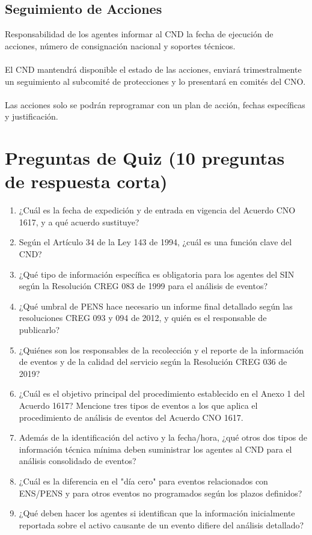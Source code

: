 \documentclass[a5paper]{book}%
\begin{document}
\subsection{Seguimiento de Acciones}

    Responsabilidad de los agentes informar al CND la fecha de ejecución de acciones, número de consignación nacional y soportes técnicos.\\\\
    El CND mantendrá disponible el estado de las acciones, enviará trimestralmente un seguimiento al subcomité de protecciones y lo presentará en comités del CNO.\\\\
    Las acciones solo se podrán reprogramar con un plan de acción, fechas específicas y justificación.

\section{Preguntas de Quiz (10 preguntas de respuesta corta)}

\begin{enumerate}
\item ¿Cuál es la fecha de expedición y de entrada en vigencia del Acuerdo CNO 1617, y a qué acuerdo sustituye?
\item Según el Artículo 34 de la Ley 143 de 1994, ¿cuál es una función clave del CND?
\item ¿Qué tipo de información específica es obligatoria para los agentes del SIN según la Resolución CREG 083 de 1999 para el análisis de eventos?
\item ¿Qué umbral de PENS hace necesario un informe final detallado según las resoluciones CREG 093 y 094 de 2012, y quién es el responsable de publicarlo?
\item ¿Quiénes son los responsables de la recolección y el reporte de la información de eventos y de la calidad del servicio según la Resolución CREG 036 de 2019?
\item ¿Cuál es el objetivo principal del procedimiento establecido en el Anexo 1 del Acuerdo 1617?
    Mencione tres tipos de eventos a los que aplica el procedimiento de análisis de eventos del Acuerdo CNO 1617.
  \item Además de la identificación del activo y la fecha/hora, ¿qué otros dos tipos de información técnica mínima deben suministrar los agentes al CND para el análisis consolidado de eventos?
  \item ¿Cuál es la diferencia en el "día cero" para eventos relacionados con ENS/PENS y para otros eventos no programados según los plazos definidos?
  \item ¿Qué deben hacer los agentes si identifican que la información inicialmente reportada sobre el activo causante de un evento difiere del análisis detallado?
  \end{enumerate}
  
\end{document}
